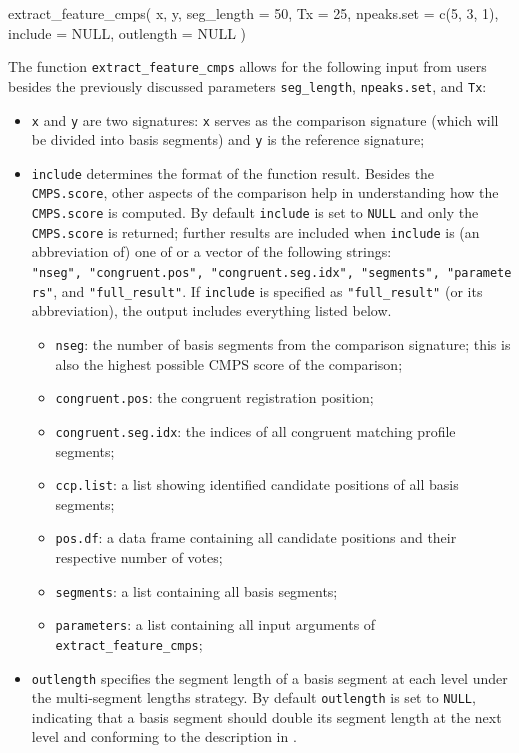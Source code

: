 \begin{Schunk}
\begin{Sinput}
extract_feature_cmps(
  x,
  y,
  seg_length = 50,
  Tx = 25,
  npeaks.set = c(5, 3, 1),
  include = NULL,
  outlength = NULL
)
\end{Sinput}
\end{Schunk}

The function \texttt{extract\_feature\_cmps} allows for the following
input from users besides the previously discussed parameters
\texttt{seg\_length}, \texttt{npeaks.set}, and \texttt{Tx}:

\begin{itemize}
\item
  \texttt{x} and \texttt{y} are two signatures: \texttt{x} serves as the
  comparison signature (which will be divided into basis segments) and
  \texttt{y} is the reference signature;
\item
  \texttt{include} determines the format of the function result. Besides
  the \texttt{CMPS.score}, other aspects of the comparison help in
  understanding how the \texttt{CMPS.score} is computed. By default
  \texttt{include} is set to \texttt{NULL} and only the
  \texttt{CMPS.score} is returned; further results are included when
  \texttt{include} is (an abbreviation of) one of or a vector of the
  following strings:
  \texttt{"nseg",\ "congruent.pos",\ "congruent.seg.idx",\ "segments",\ "parameters"},
  and \texttt{"full\_result"}. If \texttt{include} is specified as
  \texttt{"full\_result"} (or its abbreviation), the output includes
  everything listed below.

  \begin{itemize}
  \tightlist
  \item
    \texttt{nseg}: the number of basis segments from the comparison
    signature; this is also the highest possible CMPS score of the
    comparison;
  \item
    \texttt{congruent.pos}: the congruent registration position;
  \item
    \texttt{congruent.seg.idx}: the indices of all congruent matching
    profile segments;
  \item
    \texttt{ccp.list}: a list showing identified candidate positions of
    all basis segments;
  \item
    \texttt{pos.df}: a data frame containing all candidate positions and
    their respective number of votes;
  \item
    \texttt{segments}: a list containing all basis segments;
  \item
    \texttt{parameters}: a list containing all input arguments of
    \texttt{extract\_feature\_cmps};
  \end{itemize}
\item
  \texttt{outlength} specifies the segment length of a basis segment at
  each level under the multi-segment lengths strategy. By default
  \texttt{outlength} is set to \texttt{NULL}, indicating that a basis
  segment should double its segment length at the next level and
  conforming to the description in \citet{cmps} .
\end{itemize}

